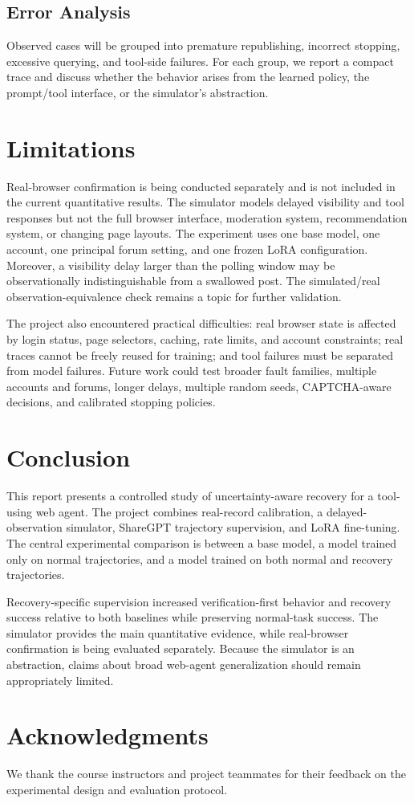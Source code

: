 \documentclass[11pt]{article}
\begin{document}
\subsection{Error Analysis}

Observed cases will be grouped into premature republishing, incorrect stopping, excessive querying, and tool-side failures. For each group, we report a compact trace and discuss whether the behavior arises from the learned policy, the prompt/tool interface, or the simulator's abstraction.

\section{Limitations}

Real-browser confirmation is being conducted separately and is not included in the current quantitative results. The simulator models delayed visibility and tool responses but not the full browser interface, moderation system, recommendation system, or changing page layouts. The experiment uses one base model, one account, one principal forum setting, and one frozen LoRA configuration. Moreover, a visibility delay larger than the polling window may be observationally indistinguishable from a swallowed post. The simulated/real observation-equivalence check remains a topic for further validation.

The project also encountered practical difficulties: real browser state is affected by login status, page selectors, caching, rate limits, and account constraints; real traces cannot be freely reused for training; and tool failures must be separated from model failures. Future work could test broader fault families, multiple accounts and forums, longer delays, multiple random seeds, CAPTCHA-aware decisions, and calibrated stopping policies.

\section{Conclusion}

This report presents a controlled study of uncertainty-aware recovery for a tool-using web agent. The project combines real-record calibration, a delayed-observation simulator, ShareGPT trajectory supervision, and LoRA fine-tuning. The central experimental comparison is between a base model, a model trained only on normal trajectories, and a model trained on both normal and recovery trajectories.

Recovery-specific supervision increased verification-first behavior and recovery success relative to both baselines while preserving normal-task success. The simulator provides the main quantitative evidence, while real-browser confirmation is being evaluated separately. Because the simulator is an abstraction, claims about broad web-agent generalization should remain appropriately limited.

\section*{Acknowledgments}

We thank the course instructors and project teammates for their feedback on the experimental design and evaluation protocol.


\end{document}
